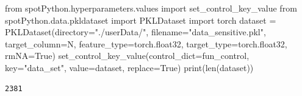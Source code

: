 \documentclass[
  letterpaper,
  DIV=11,
  numbers=noendperiod]{scrreprt}
\newenvironment{Shaded}{\begin{snugshade}}{\end{snugshade}}
\newcommand{\BuiltInTok}[1]{\textcolor[rgb]{0.00,0.23,0.31}{#1}}
\newcommand{\ImportTok}[1]{\textcolor[rgb]{0.00,0.46,0.62}{#1}}
\newcommand{\NormalTok}[1]{\textcolor[rgb]{0.00,0.23,0.31}{#1}}
\newcommand{\OperatorTok}[1]{\textcolor[rgb]{0.37,0.37,0.37}{#1}}
\newcommand{\StringTok}[1]{\textcolor[rgb]{0.13,0.47,0.30}{#1}}
\newcommand{\VariableTok}[1]{\textcolor[rgb]{0.07,0.07,0.07}{#1}}
\begin{document}
\begin{Shaded}
\begin{Highlighting}[]
\ImportTok{from}\NormalTok{ spotPython.hyperparameters.values }\ImportTok{import}\NormalTok{ set\_control\_key\_value}
\ImportTok{from}\NormalTok{ spotPython.data.pkldataset }\ImportTok{import}\NormalTok{ PKLDataset}
\ImportTok{import}\NormalTok{ torch}
\NormalTok{dataset }\OperatorTok{=}\NormalTok{ PKLDataset(directory}\OperatorTok{=}\StringTok{"./userData/"}\NormalTok{,}
\NormalTok{                     filename}\OperatorTok{=}\StringTok{"data\_sensitive.pkl"}\NormalTok{,}
\NormalTok{                     target\_column}\OperatorTok{=}\StringTok{\textquotesingle{}N\textquotesingle{}}\NormalTok{,}
\NormalTok{                     feature\_type}\OperatorTok{=}\NormalTok{torch.float32,}
\NormalTok{                     target\_type}\OperatorTok{=}\NormalTok{torch.float32,}
\NormalTok{                     rmNA}\OperatorTok{=}\VariableTok{True}\NormalTok{)}
\NormalTok{set\_control\_key\_value(control\_dict}\OperatorTok{=}\NormalTok{fun\_control,}
\NormalTok{                        key}\OperatorTok{=}\StringTok{"data\_set"}\NormalTok{,}
\NormalTok{                        value}\OperatorTok{=}\NormalTok{dataset,}
\NormalTok{                        replace}\OperatorTok{=}\VariableTok{True}\NormalTok{)}
\BuiltInTok{print}\NormalTok{(}\BuiltInTok{len}\NormalTok{(dataset))}
\end{Highlighting}
\end{Shaded}

\begin{verbatim}
2381
\end{verbatim}
\end{document}
